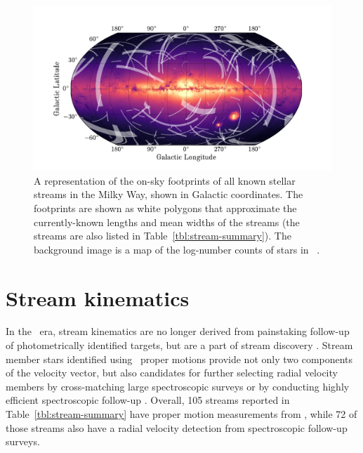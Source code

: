 \documentclass[final,5p,times,twocolumn,authoryear]{elsarticle}
\begin{document}
\begin{figure}[t!]
\begin{center}
\includegraphics[width=1\textwidth]{stream-sky-map.pdf}
\end{center}
\caption{%
A representation of the on-sky footprints of all known stellar streams in the Milky Way,
shown in Galactic coordinates.
The footprints are shown as white polygons that approximate the currently-known lengths
and mean widths of the streams (the streams are also listed in
Table~\ref{tbl:stream-summary}).
The background image is a map of the log-number counts of stars in \gaia\ .
}
\label{fig:sky-map}
\end{figure}


\section{Stream kinematics}
\label{sec:orbits}
In the \gaia\ era, stream kinematics are no longer derived from painstaking follow-up of photometrically identified targets, but are a part of stream discovery \citep[e.g.,][]{malhan:2018b, malhan:2019, ibata:2018, ibata:2019, ibata:2021, grillmair:2019, grillmair:2022}.
Stream member stars identified using \gaia\ proper motions provide not only two components of the velocity vector, but also candidates for further selecting radial velocity members by cross-matching large spectroscopic surveys \citep[e.g.,][]{huang:2019, yang:2022, ibata:2023} or by conducting highly efficient spectroscopic follow-up \citep[e.g.,][]{li:2019, bonaca:2020b}.
Overall, 105 streams reported in Table~\ref{tbl:stream-summary} have proper motion measurements from \gaia, while 72 of those streams also have a radial velocity detection from spectroscopic follow-up surveys.
\end{document}
